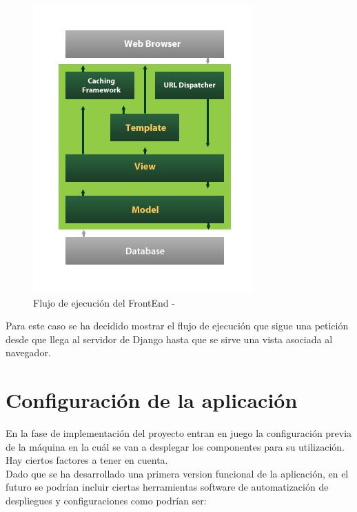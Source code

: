 \begin{figure}[H]
  \begin{center}
  \includegraphics[scale=0.7]{diagramas/django-workflow.png}
  \caption{Flujo de ejecución del FrontEnd - ~\cite{74}}
  \end{center}
\end{figure}

Para este caso se ha decidido mostrar el flujo de ejecución que sigue una petición desde que llega al servidor de Django hasta que se sirve una vista asociada al navegador. \\

\section{Configuración de la aplicación}

En la fase de implementación del proyecto entran en juego la configuración previa de la máquina en la cuál se van a desplegar los componentes para su utilización. Hay ciertos factores a tener en cuenta. \\

Dado que se ha desarrollado una primera version funcional de la aplicación, en el futuro se podrían incluir ciertas herramientas software de automatización de despliegues y configuraciones como podrían ser:
\pagebreak
